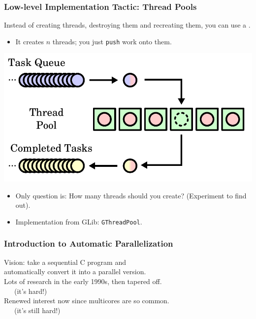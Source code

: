 \documentclass[aspectratio=43]{beamer}
\newenvironment{changemargin}[1]{%
  \begin{list}{}{%
    \setlength{\topsep}{0pt}%
    \setlength{\leftmargin}{#1}%
    \setlength{\rightmargin}{1em}
    \setlength{\listparindent}{\parindent}%
    \setlength{\itemindent}{\parindent}%
    \setlength{\parsep}{\parskip}%
  }%
  \item[]}{\end{list}}
\begin{document}
\begin{frame}
  \frametitle{Low-level Implementation Tactic: Thread Pools}
  
  \begin{changemargin}{2.5cm}
    Instead of creating threads, destroying them and recreating them, you
      can use a .
    \begin{itemize}
    \item It creates $n$ threads; you just {\tt push} work onto them.
    \end{itemize}

  \begin{center}
    \includegraphics[scale=0.4]{L13/thread-pool}
  \end{center}

  \begin{itemize}
    \item Only question is: How many threads should you create? (Experiment to find out).
    \item Implementation from GLib: {\tt GThreadPool}.
  \end{itemize}
  \end{changemargin}

\end{frame}


\begin{frame}
  \frametitle{Introduction to Automatic Parallelization}

  \begin{changemargin}{2.5cm}
    Vision: take a sequential C program and \\ automatically convert it into a parallel version.\\[1em]

    Lots of research in the early 1990s, then tapered off.\\~~~(it's hard!)\\[1em]

    Renewed interest now since multicores are so common.\\~~~(it's still hard!)
  \end{changemargin}
\end{frame}
\end{document}
